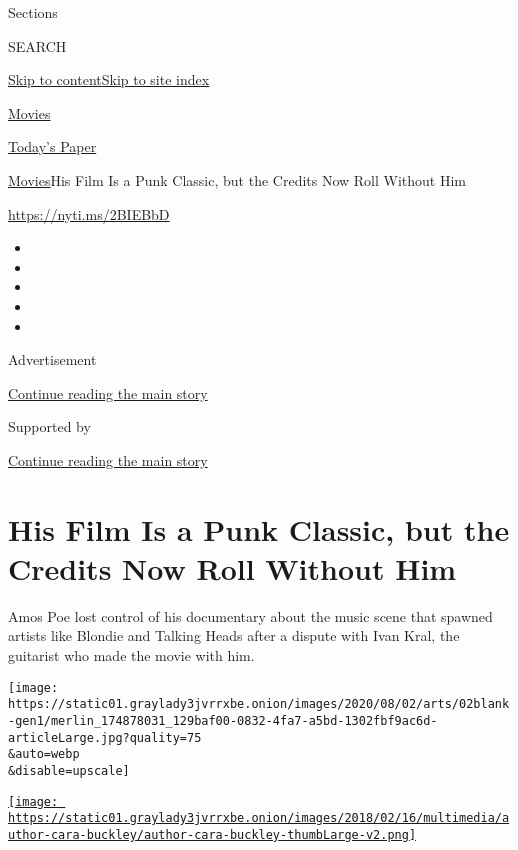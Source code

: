 Sections

SEARCH

\protect\hyperlink{site-content}{Skip to
content}\protect\hyperlink{site-index}{Skip to site index}

\href{https://www.nytimes3xbfgragh.onion/section/movies}{Movies}

\href{https://myaccount.nytimes3xbfgragh.onion/auth/login?response_type=cookie\&client_id=vi}{}

\href{https://www.nytimes3xbfgragh.onion/section/todayspaper}{Today's
Paper}

\href{/section/movies}{Movies}\textbar{}His Film Is a Punk Classic, but
the Credits Now Roll Without Him

\url{https://nyti.ms/2BIEBbD}

\begin{itemize}
\item
\item
\item
\item
\item
\end{itemize}

Advertisement

\protect\hyperlink{after-top}{Continue reading the main story}

Supported by

\protect\hyperlink{after-sponsor}{Continue reading the main story}

\hypertarget{his-film-is-a-punk-classic-but-the-credits-now-roll-without-him}{%
\section{His Film Is a Punk Classic, but the Credits Now Roll Without
Him}\label{his-film-is-a-punk-classic-but-the-credits-now-roll-without-him}}

Amos Poe lost control of his documentary about the music scene that
spawned artists like Blondie and Talking Heads after a dispute with Ivan
Kral, the guitarist who made the movie with him.

\texttt{[image: https://static01.graylady3jvrrxbe.onion/images/2020/08/02/arts/02blank-gen1/merlin\_174878031\_129baf00-0832-4fa7-a5bd-1302fbf9ac6d-articleLarge.jpg?quality=75\\\&auto=webp\\\&disable=upscale]}

\href{https://www.nytimes3xbfgragh.onion/by/cara-buckley}{\texttt{[image: https://static01.graylady3jvrrxbe.onion/images/2018/02/16/multimedia/author-cara-buckley/author-cara-buckley-thumbLarge-v2.png]}}

